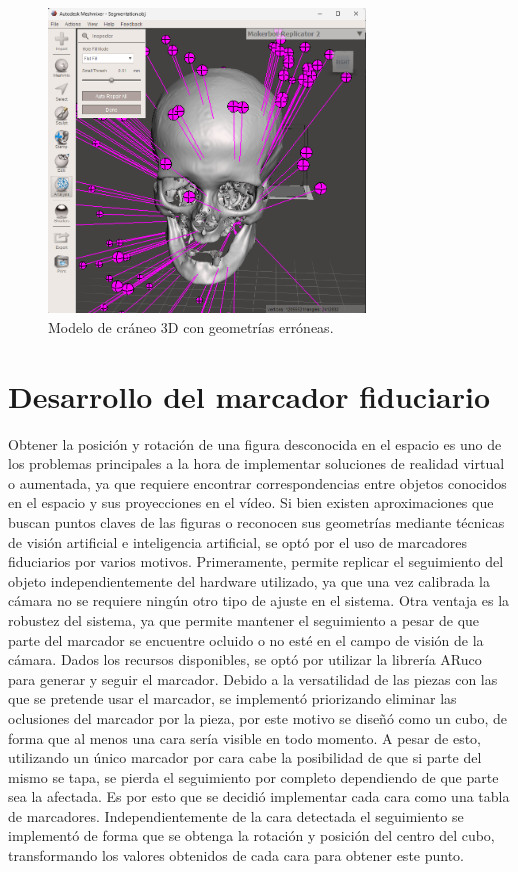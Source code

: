 \begin{figure}[hp!]
  \centering
  \includegraphics[width=0.75\textwidth]{imaxes/arreglo_geo.png}
  \caption{Modelo de cráneo 3D con geometrías erróneas.}
  \label{fig:arr_geo}
\end{figure}
 
\section{Desarrollo del marcador fiduciario}
Obtener la posición y rotación de una figura desconocida en el espacio es uno de los problemas principales a la hora de implementar soluciones de realidad virtual o aumentada, ya que requiere encontrar correspondencias entre objetos conocidos en el espacio y sus proyecciones en el vídeo.
Si bien existen aproximaciones que buscan puntos claves de las figuras o reconocen sus geometrías mediante técnicas de visión artificial e inteligencia artificial, se optó por el uso de  marcadores fiduciarios por varios motivos.
Primeramente, permite replicar el seguimiento del objeto independientemente del hardware utilizado, ya que una vez calibrada la cámara no se requiere ningún otro tipo de ajuste en el sistema. Otra ventaja es la robustez del sistema, ya que permite mantener el seguimiento a pesar de que parte del marcador se encuentre ocluido o no esté en el campo de visión de la cámara.
Dados los recursos disponibles, se optó por utilizar la librería ARuco para generar y seguir el marcador.
Debido a la versatilidad de las piezas con las que se pretende usar el marcador, se implementó priorizando eliminar las oclusiones del marcador por la pieza, por este motivo se diseñó como un cubo, de forma que al menos una cara sería visible en todo momento. A pesar de esto, utilizando un único marcador por cara cabe la posibilidad de que si parte del mismo se tapa, se pierda el seguimiento por completo dependiendo de que parte sea la afectada. Es por esto que se decidió implementar cada cara como una tabla de marcadores. Independientemente de la cara detectada el seguimiento se implementó de forma que se obtenga la rotación y posición del centro del cubo, transformando los valores obtenidos de cada cara para obtener este punto.

